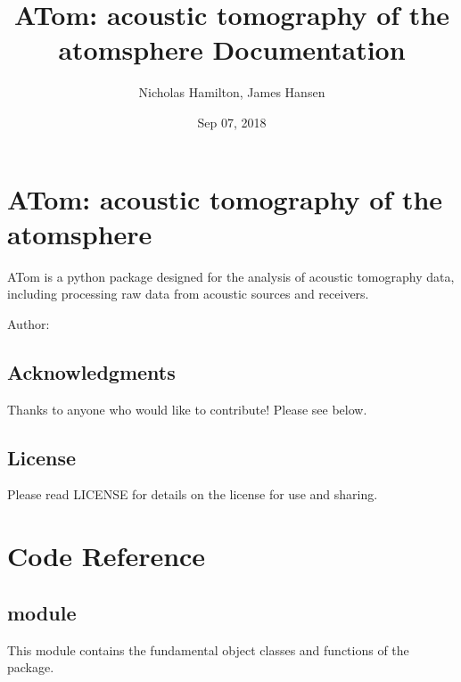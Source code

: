 \documentclass[letterpaper,10pt,english]{sphinxmanual}
\title{ATom: acoustic tomography of the atomsphere Documentation}
\date{Sep 07, 2018}
\author{Nicholas Hamilton, James Hansen}
\begin{document}
\maketitle
\sphinxtableofcontents
{}\label{\detokenize{index::doc}}



\chapter{ATom: acoustic tomography of the atomsphere}
\label{\detokenize{README:atom-acoustic-tomography-of-the-atomsphere}}\label{\detokenize{README::doc}}
ATom is a python package designed for the analysis of acoustic tomography data, including processing raw data from acoustic sources and receivers.
\begin{description}
\item[{Author: }] \leavevmode
{}

\end{description}


\section{Acknowledgments}
\label{\detokenize{README:acknowledgments}}
Thanks to anyone who would like to contribute! Please see below.


\section{License}
\label{\detokenize{README:license}}
Please read LICENSE for details on the license for use and sharing.


\chapter{Code Reference}
\label{\detokenize{code:code-reference}}\label{\detokenize{code::doc}}

\section{ module}
\label{\detokenize{code:atom-functions-module}}
This module contains the fundamental object classes and functions of the package.

\label{\detokenize{code:module-ATom.atom_functions}}
\end{document}

